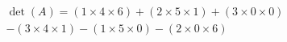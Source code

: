 \documentclass[preview]{standalone}
\begin{document}
\begin{align*}
\det(A) = (1 \times 4 \times 6) + (2 \times 5 \times 1) + (3 \times 0 \times 0) \\ - (3 \times 4 \times 1) - (1 \times 5 \times 0) - (2 \times 0 \times 6)
\end{align*}
\end{document}
